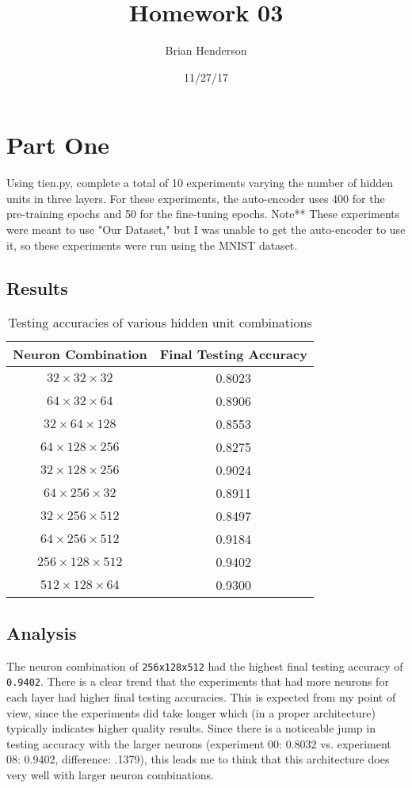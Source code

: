 \documentclass[a4paper]{article}
\title{Homework 03}
\author{Brian Henderson}
\date{11/27/17}
\begin{document}
\maketitle
\section{Part One}
Using tien.py, complete a total of 10 experiments varying the number of hidden units in three layers. For these experiments, the auto-encoder uses 400 for the pre-training epochs and 50 for the fine-tuning epochs. Note** These experiments were meant to use "Our Dataset," but I was unable to get the auto-encoder to use it, so these experiments were run using the MNIST dataset.

\subsection{Results}
\begin{table}[h]
 \caption{Testing accuracies of various hidden unit combinations}
 \label{table}
 \begin{center}
  \begin{tabular}{c|c}
    \hline \hline
    Neuron Combination & Final Testing Accuracy \\
    \hline
    $32  \times 32  \times 32 $ &  0.8023 \\
    $64  \times 32  \times 64 $ & 0.8906 \\
    $32  \times 64  \times 128$ & 0.8553\\
    $64  \times 128 \times 256$ & 0.8275 \\
    $32  \times 128 \times 256$ & 0.9024 \\
    $64  \times 256 \times 32 $ & 0.8911\\
    $32  \times 256 \times 512$ & 0.8497 \\
    $64  \times 256 \times 512$ & 0.9184 \\
    $256 \times 128 \times 512$ & 0.9402 \\
    $512 \times 128 \times 64 $ & 0.9300
  \end{tabular}
 \end{center}
\end{table}

\subsection{Analysis}
The neuron combination of \texttt{256x128x512} had the highest final testing accuracy of \texttt{0.9402}. There is a clear trend that the experiments that had more neurons for each layer had higher final testing accuracies. This is expected from my point of view, since the experiments did take longer which (in a proper architecture) typically indicates higher quality results. Since there is a noticeable jump in testing accuracy with the larger neurons (experiment 00: 0.8032 vs. experiment 08: 0.9402, difference: .1379), this leads me to think that this architecture does very well with larger neuron combinations.
\end{document}
